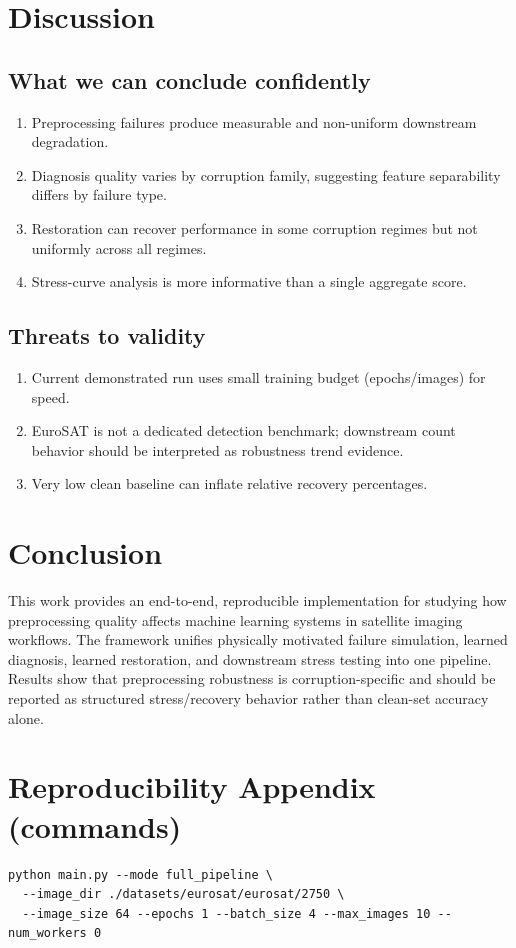 \documentclass[11pt]{article}
\begin{document}
\section{Discussion}
\subsection{What we can conclude confidently}
\begin{enumerate}
\item Preprocessing failures produce measurable and non-uniform downstream degradation.
\item Diagnosis quality varies by corruption family, suggesting feature separability differs by failure type.
\item Restoration can recover performance in some corruption regimes but not uniformly across all regimes.
\item Stress-curve analysis is more informative than a single aggregate score.
\end{enumerate}

\subsection{Threats to validity}
\begin{enumerate}
\item Current demonstrated run uses small training budget (epochs/images) for speed.
\item EuroSAT is not a dedicated detection benchmark; downstream count behavior should be interpreted as robustness trend evidence.
\item Very low clean baseline can inflate relative recovery percentages.
\end{enumerate}

\section{Conclusion}
This work provides an end-to-end, reproducible implementation for studying how preprocessing quality affects machine learning systems in satellite imaging workflows. The framework unifies physically motivated failure simulation, learned diagnosis, learned restoration, and downstream stress testing into one pipeline. Results show that preprocessing robustness is corruption-specific and should be reported as structured stress/recovery behavior rather than clean-set accuracy alone.

\section*{Reproducibility Appendix (commands)}
\begin{verbatim}
python main.py --mode full_pipeline \
  --image_dir ./datasets/eurosat/eurosat/2750 \
  --image_size 64 --epochs 1 --batch_size 4 --max_images 10 --num_workers 0
\end{verbatim}
\end{document}
